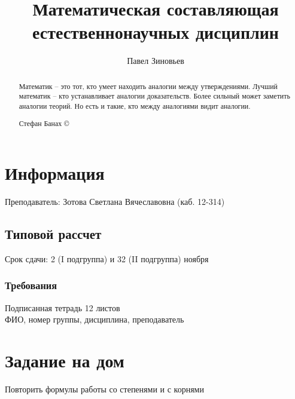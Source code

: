 \documentclass[a4paper, 11pt, oneside]{article}
\title{Математическая составляющая естественнонаучных дисциплин}
\author{Павел Зиновьев}
\begin{document}
\maketitle
\begin{abstract}
	Математик – это тот, кто умеет находить аналогии между утверждениями. Лучший 
	математик – кто устанавливает аналогии доказательств. Более сильный может заметить 
	аналогии теорий. Но есть и такие, кто между аналогиями видит аналогии.
	\begin{flushright}
		 Стефан Банах \copyright
	\end{flushright}
\end{abstract}
\newpage
\tableofcontents
\contentsname
\newpage


\section{Информация}
Преподаватель: Зотова Светлана Вячеславовна (каб. 12-314)
\subsection{Типовой рассчет}
Срок сдачи: 2 (I подгруппа) и 32 (II подгруппа)  ноября
\subsubsection{Требования}
Подписанная тетрадь 12 листов\\
ФИО, номер группы, дисциплина, преподаватель


\section{Задание на дом}


Повторить формулы работы со степенями и с корнями
\end{document}
